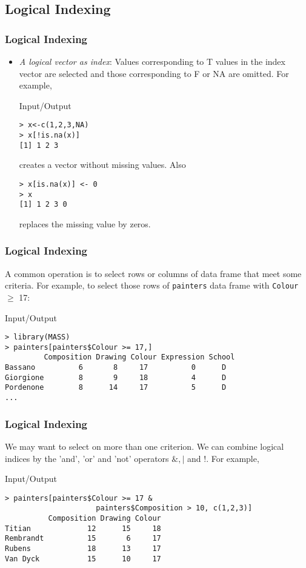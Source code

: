 \documentclass[xcolor={table},c]{beamer}
\begin{document}
\subsection{Logical Indexing}
\begin{frame}\frametitle{Logical Indexing}
\begin{itemize}
\item \emph{A logical vector as index}: Values corresponding to T values in the index vector are selected and those corresponding to F or NA are omitted. For example,
\begin{exampleblock}{Input/Output}
\begin{verbatim}
> x<-c(1,2,3,NA)
> x[!is.na(x)]
[1] 1 2 3
\end{verbatim}
creates a vector without missing values. Also
\begin{verbatim}
> x[is.na(x)] <- 0
> x
[1] 1 2 3 0
\end{verbatim}
replaces the missing value by zeros.
\end{exampleblock}
\end{itemize}
\end{frame}


\begin{frame}[fragile]\frametitle{Logical Indexing} %
A common operation is to select rows or columns of data frame that meet some criteria. For example, to select those rows of \texttt{painters} data frame with \texttt{Colour} $\geq$ 17:
\begin{exampleblock}{Input/Output}
\begin{verbatim}
> library(MASS)
> painters[painters$Colour >= 17,]
         Composition Drawing Colour Expression School
Bassano          6       8     17          0      D
Giorgione        8       9     18          4      D
Pordenone        8      14     17          5      D
...
\end{verbatim}
\end{exampleblock}
\end{frame}

\begin{frame}[fragile]\frametitle{Logical Indexing}
We may want to select on more than one criterion. We can combine logical indices by the 'and', 'or' and 'not' operators $\mathtt{\&,  | }$ and $\mathtt{!}$. For example,
\begin{exampleblock}{Input/Output}
\begin{verbatim}
> painters[painters$Colour >= 17 & 
                     painters$Composition > 10, c(1,2,3)]
          Composition Drawing Colour
Titian             12      15     18
Rembrandt          15       6     17
Rubens             18      13     17
Van Dyck           15      10     17
\end{verbatim}
\end{exampleblock}
\end{frame}
\end{document}
